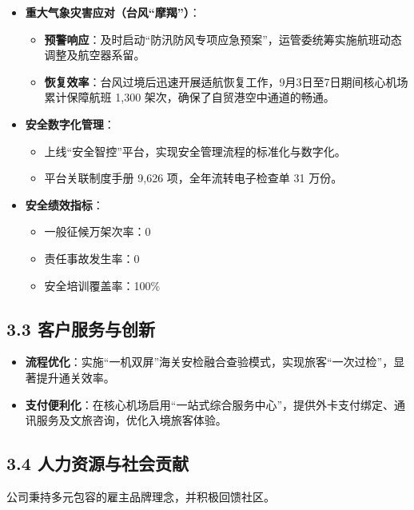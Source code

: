 \documentclass[a4paper,12pt]{article}
\begin{document}
\begin{itemize}
    \item \textbf{重大气象灾害应对（台风“摩羯”）}：
    \begin{itemize}
        \item \textbf{预警响应}：及时启动“防汛防风专项应急预案”，运管委统筹实施航班动态调整及航空器系留。
        \item \textbf{恢复效率}：台风过境后迅速开展适航恢复工作，9月3日至7日期间核心机场累计保障航班 1,300 架次，确保了自贸港空中通道的畅通。
    \end{itemize}
    
    \item \textbf{安全数字化管理}：
    \begin{itemize}
        \item 上线“安全智控”平台，实现安全管理流程的标准化与数字化。
        \item 平台关联制度手册 9,626 项，全年流转电子检查单 31 万份。
    \end{itemize}

    \item \textbf{安全绩效指标}：
    \begin{itemize}
        \item 一般征候万架次率：0
        \item 责任事故发生率：0
        \item 安全培训覆盖率：100\%
    \end{itemize}
\end{itemize}

\subsection{3.3 客户服务与创新}

\begin{itemize}
    \item \textbf{流程优化}：实施“一机双屏”海关安检融合查验模式，实现旅客“一次过检”，显著提升通关效率。
    \item \textbf{支付便利化}：在核心机场启用“一站式综合服务中心”，提供外卡支付绑定、通讯服务及文旅咨询，优化入境旅客体验。
\end{itemize}

\subsection{3.4 人力资源与社会贡献}

公司秉持多元包容的雇主品牌理念，并积极回馈社区。
\end{document}
